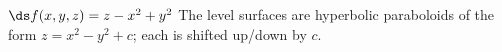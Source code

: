 {$\ds f(x,y,z) = z-x^2+y^2$
}
{The level surfaces are hyperbolic paraboloids of the form $z=x^2-y^2+c$; each is shifted up/down by $c$.
}